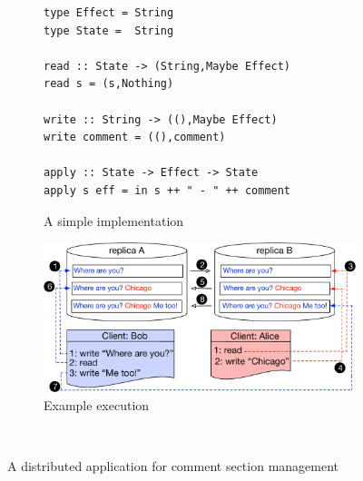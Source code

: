 \begin{figure}[t]
        \centering
	\begin{subfigure}[b]{0.489\textwidth}
	\begin{lstlisting}
type Effect = String 
type State =  String 

read :: State -> (String,Maybe Effect)
read s = (s,Nothing)

write :: String -> ((),Maybe Effect)
write comment = ((),comment)

apply :: State -> Effect -> State 
apply s eff = in s ++ " - " ++ comment
	\end{lstlisting}
	\caption{A simple implementation}
	\label{subfig:comment_code}
	\end{subfigure}
	\hfill
	\begin{subfigure}[b]{0.475\textwidth}
	\includegraphics[scale=0.282]{Figures/comment_application.pdf}
	\caption{Example execution}
	\label{subfig:comment_example}
	\end{subfigure} 
\\ \hrulefill
\caption{A distributed application for comment section
management}
\label{fig:comment_app}
\end{figure}


